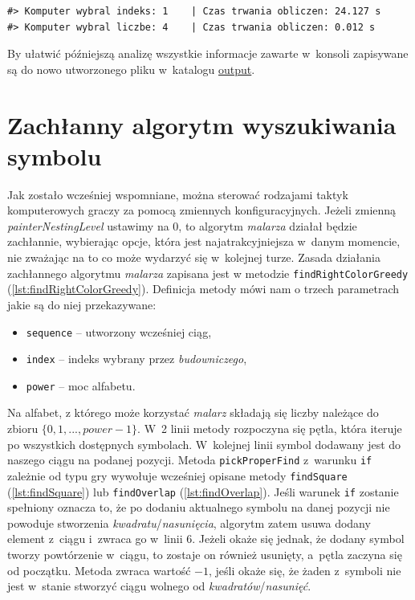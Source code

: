 \documentclass[document]{xmgr}
\begin{document}
\begin{lstlisting}[caption={Sposób wyświetlania podjętych decyzji algorytmu.},label=lst:pcPcExample]
#> Komputer wybral indeks: 1 	| Czas trwania obliczen: 24.127 s
#> Komputer wybral liczbe: 4 	| Czas trwania obliczen: 0.012 s
\end{lstlisting}
\noindent By ułatwić późniejszą analizę wszystkie informacje zawarte w~konsoli zapisywane są do nowo utworzonego pliku w~katalogu \underline{output}.

\section{Zachłanny algorytm wyszukiwania symbolu}
Jak zostało wcześniej wspomniane, można sterować rodzajami taktyk komputerowych graczy za pomocą zmiennych konfiguracyjnych. Jeżeli zmienną \emph{painterNestingLevel} ustawimy na $0$, to algorytm \emph{malarza} działał będzie zachłannie, wybierając opcje, która jest najatrakcyjniejsza w~danym momencie, nie zważając na to co może wydarzyć się w~kolejnej turze. Zasada działania zachłannego algorytmu \emph{malarza} zapisana jest w metodzie \texttt{findRightColorGreedy} (\ref{lst:findRightColorGreedy}). Definicja metody mówi nam o trzech parametrach jakie są do niej przekazywane:
\begin{itemize}
\item \texttt{sequence} -- utworzony wcześniej ciąg,
\item \texttt{index} -- indeks wybrany przez \emph{budowniczego},
\item \texttt{power} -- moc alfabetu.
\end{itemize}
Na alfabet, z którego może korzystać \emph{malarz} składają się liczby należące do zbioru $\{0, 1, ..., power-1\}$. W~2 linii metody rozpoczyna się pętla, która iteruje po wszystkich dostępnych symbolach. W~kolejnej linii symbol dodawany jest do naszego ciągu na podanej pozycji. Metoda \texttt{pickProperFind} z~warunku \texttt{if} zależnie od typu gry wywołuje wcześniej opisane metody \texttt{findSquare} (\ref{lst:findSquare}) lub \texttt{findOverlap} (\ref{lst:findOverlap}). Jeśli warunek \texttt{if} zostanie spełniony oznacza to, że po dodaniu aktualnego symbolu na danej pozycji nie powoduje stworzenia \emph{kwadratu}/\emph{nasunięcia}, algorytm zatem usuwa dodany element z~ciągu i~zwraca go w~linii 6. Jeżeli  okaże się jednak, że dodany symbol tworzy powtórzenie w~ciągu, to zostaje on również usunięty, a~pętla zaczyna się od początku. Metoda zwraca wartość $-1$, jeśli okaże się, że żaden z~symboli nie jest w~stanie stworzyć ciągu wolnego od \emph{kwadratów}/\emph{nasunięć}.
\end{document}
